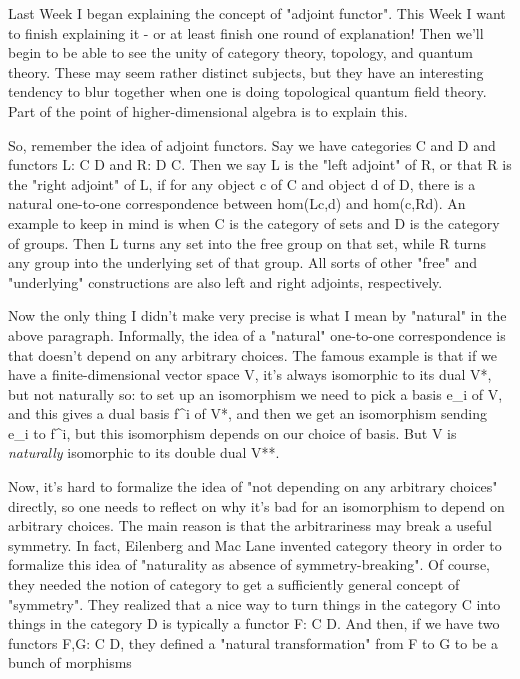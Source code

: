 


Last Week I began explaining the concept of "adjoint functor".  
This Week I want to finish explaining it - or at least finish
one round of explanation!   Then we'll begin to be able to 
see the unity of category theory, topology, and quantum theory.  
These may seem rather distinct subjects, but they have
an interesting tendency to blur together when one is doing topological
quantum field theory.  Part of the point of higher-dimensional
algebra is to explain this.  

So, remember the idea of adjoint functors.  Say we have categories C and D 
and functors L: C \to  D and R: D \to  C.  Then we say L is the "left adjoint" of 
R, or that R is the "right adjoint" of L, if for any object c of C and object
d of D, there is a natural one-to-one correspondence between hom(Lc,d) and 
hom(c,Rd).  An example to keep in mind is when C is the category of sets
and D is the category of groups.   Then L turns any set into the free group
on that set, while R turns any group into the underlying set of that group.
All sorts of other "free" and "underlying" constructions are also left and
right adjoints, respectively.   

Now the only thing I didn't make very precise is what I mean by
"natural" in the above paragraph.  Informally, the idea of a
"natural" one-to-one correspondence is that doesn't depend
on any arbitrary choices.  The famous example is that if we have a
finite-dimensional vector space V, it's always isomorphic to its dual
V*, but not naturally so: to set up an isomorphism we need to pick a
basis e_{i} of V, and this gives a dual basis f^{i} of V*, and
then we get an isomorphism sending e_{i} to f^{i}, but this
isomorphism depends on our choice of basis.  But V is
\emph{naturally} isomorphic to its double dual V**.

Now, it's hard to formalize the idea of "not depending on any arbitrary
choices" directly, so one needs to reflect on why it's bad for an 
isomorphism to depend on arbitrary choices.  The main reason 
is that the arbitrariness may break a useful symmetry.  
In fact, Eilenberg and Mac Lane invented category theory in order to 
formalize this idea of "naturality as absence of symmetry-breaking".  
Of course, they needed the notion of category to get a sufficiently general
concept of "symmetry".  They realized that a nice way 
to turn things in the category C into things in the category D is typically
a functor F: C \to  D.  And then, if we have two functors F,G: C \to  D, they
defined a "natural transformation" from F to G to be a bunch of morphisms

